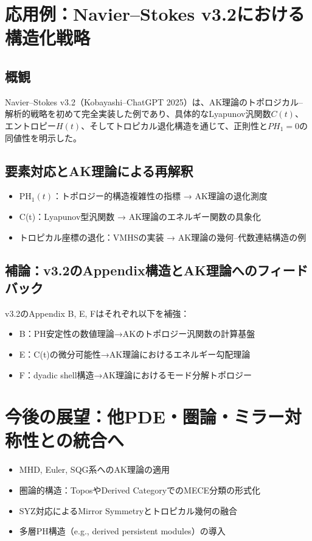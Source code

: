 \documentclass[11pt]{article}
\begin{document}
\section{応用例：Navier--Stokes v3.2における構造化戦略}
\subsection{概観}
Navier--Stokes v3.2（Kobayashi--ChatGPT 2025）は、AK理論のトポロジカル–解析的戦略を初めて完全実装した例であり、具体的なLyapunov汎関数\(C(t)\)、エントロピー\(H(t)\)、そしてトロピカル退化構造を通じて、正則性と\(PH_1=0\)の同値性を明示した。

\subsection{要素対応とAK理論による再解釈}
\begin{itemize}
  \item PH\(_1(t)\)：トポロジー的構造複雑性の指標 → AK理論の退化測度
  \item C(t)：Lyapunov型汎関数 → AK理論のエネルギー関数の具象化
  \item トロピカル座標の退化：VMHSの実装 → AK理論の幾何–代数連結構造の例
\end{itemize}

\subsection{補論：v3.2のAppendix構造とAK理論へのフィードバック}
v3.2のAppendix B, E, Fはそれぞれ以下を補強：
\begin{itemize}
  \item B：PH安定性の数値理論→AKのトポロジー汎関数の計算基盤
  \item E：C(t)の微分可能性→AK理論におけるエネルギー勾配理論
  \item F：dyadic shell構造→AK理論におけるモード分解トポロジー
\end{itemize}

\section{今後の展望：他PDE・圏論・ミラー対称性との統合へ}
\begin{itemize}
  \item MHD, Euler, SQG系へのAK理論の適用
  \item 圏論的構造：ToposやDerived CategoryでのMECE分類の形式化
  \item SYZ対応によるMirror Symmetryとトロピカル幾何の融合
  \item 多層PH構造（e.g., derived persistent modules）の導入
\end{itemize}
\end{document}
